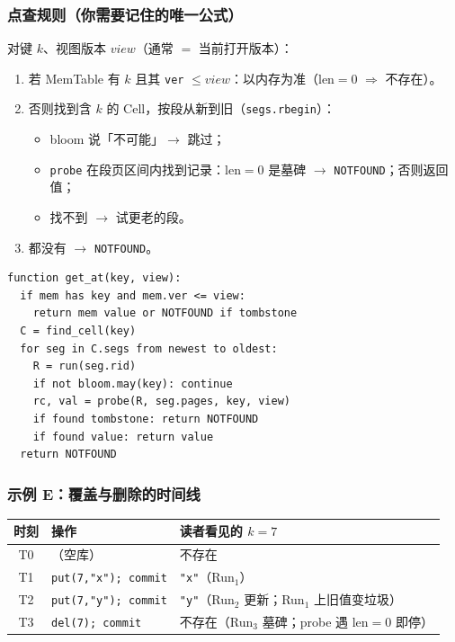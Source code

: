 \subsubsection{点查规则（你需要记住的唯一公式）}
对键 $k$、视图版本 $\mathit{view}$（通常 $=$ 当前打开版本）：

\begin{enumerate}[leftmargin=1.6em]
  \item 若 MemTable 有 $k$ 且其 \texttt{ver} $\le \mathit{view}$：以内存为准（len$=0$ $\Rightarrow$ 不存在）。
  \item 否则找到含 $k$ 的 Cell，按段从新到旧（\texttt{segs.rbegin}）：
  \begin{itemize}
    \item bloom 说「不可能」$\to$ 跳过；
    \item \texttt{probe} 在段页区间内找到记录：len$=0$ 是墓碑 $\to$ \texttt{NOTFOUND}；否则返回值；
    \item 找不到 $\to$ 试更老的段。
  \end{itemize}
  \item 都没有 $\to$ \texttt{NOTFOUND}。
\end{enumerate}

\begin{lstlisting}[language=pseudo,caption={get\_at 主循环（对照 Store::get\_at）}]
function get_at(key, view):
  if mem has key and mem.ver <= view:
    return mem value or NOTFOUND if tombstone
  C = find_cell(key)
  for seg in C.segs from newest to oldest:
    R = run(seg.rid)
    if not bloom.may(key): continue
    rc, val = probe(R, seg.pages, key, view)
    if found tombstone: return NOTFOUND
    if found value: return value
  return NOTFOUND
\end{lstlisting}

\subsubsection{示例 E：覆盖与删除的时间线}
\begin{center}
\small
\begin{tabular}{@{}clp{8.6cm}@{}}
\toprule
时刻 & 操作 & 读者看见的 $k=7$ \\
\midrule
T0 & （空库） & 不存在 \\
T1 & \texttt{put(7,"x"); commit} & \texttt{"x"}（Run$_1$） \\
T2 & \texttt{put(7,"y"); commit} & \texttt{"y"}（Run$_2$ 更新；Run$_1$ 上旧值变垃圾） \\
T3 & \texttt{del(7); commit} & 不存在（Run$_3$ 墓碑；probe 遇 len$=0$ 即停） \\
\bottomrule
\end{tabular}
\end{center}

